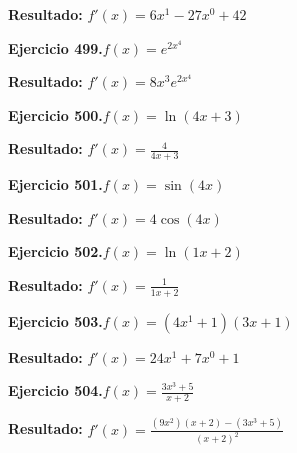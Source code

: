\documentclass[10pt,a4paper]{article}
\begin{document}
\begin{solbox}
\textbf{Resultado:} \(\displaystyle f'(x) = 6x^{1} -27x^{0} +42\)
\end{solbox}

\newpage
\begin{ejbox}
\textbf{Ejercicio 499.}\quad $f(x) = e^{2x^{4}}$
\end{ejbox}

\begin{solbox}
\textbf{Resultado:} \(\displaystyle f'(x) = 8x^{3}e^{2x^{4}}\)
\end{solbox}

\begin{ejbox}
\textbf{Ejercicio 500.}\quad $f(x) = \ln(4x + 3)$
\end{ejbox}

\begin{solbox}
\textbf{Resultado:} \(\displaystyle f'(x) = \frac{4}{4x + 3}\)
\end{solbox}

\begin{ejbox}
\textbf{Ejercicio 501.}\quad $f(x) = \sin(4x)$
\end{ejbox}

\begin{solbox}
\textbf{Resultado:} \(\displaystyle f'(x) = 4\cos(4x)\)
\end{solbox}

\newpage
\begin{ejbox}
\textbf{Ejercicio 502.}\quad $f(x) = \ln(1x + 2)$
\end{ejbox}

\begin{solbox}
\textbf{Resultado:} \(\displaystyle f'(x) = \frac{1}{1x + 2}\)
\end{solbox}

\begin{ejbox}
\textbf{Ejercicio 503.}\quad $f(x) = (4x^{1} +1)(3x +1)$
\end{ejbox}

\begin{solbox}
\textbf{Resultado:} \(\displaystyle f'(x) = 24x^{1} +7x^{0} +1\)
\end{solbox}

\begin{ejbox}
\textbf{Ejercicio 504.}\quad $f(x) = \frac{3x^{3} +5}{x + 2}$
\end{ejbox}

\begin{solbox}
\textbf{Resultado:} \(\displaystyle f'(x) = \frac{(9x^{2})(x+2) - (3x^{3} +5)}{(x+2)^2}\)
\end{solbox}
\end{document}
